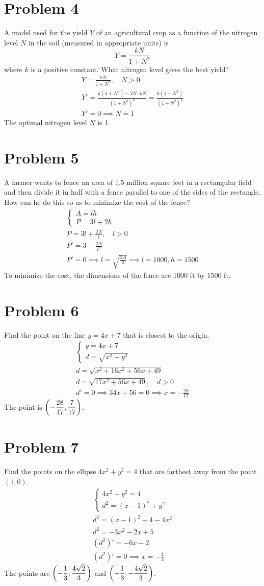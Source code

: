 \documentclass[12pt]{article}
\newcommand*{\paren}[1]{\ensuremath\left(#1\right)}
\newcommand{\problem}[1]{\section{Problem #1}}
\begin{document}
\problem{4}
 A model used for the yield $Y$ of an agricultural crop as a function of the nitrogen level $N$ in the soil
(measured in appropriate units) is
\[
Y=\frac{kN}{1+N^2}
\]
where $k$ is a positive constant. What nitrogen level gives the best yield?
\begin{gather*}
    Y=\frac{kN}{1+N^2}, \quad N>0\\
    Y'=\frac{k(1+N^2)-2N\cdot kN}{(1+N^2)^2}=\frac{k(1-N^2)}{(1+N^2)^2}\\
    Y'=0 \implies \boxed{N=1}
\end{gather*}
The optimal nitrogen level $N$ is 1.

\problem{5}
 A farmer wants to fence an area of 1.5 million square feet in a rectangular field and then divide it in half
with a fence parallel to one of the sides of the rectangle. How can he do this so as to minimize the cost
of the fence?
\begin{gather*}
    \begin{cases}
        A=lh\\
        P=3l+2h
    \end{cases}\\
    P=3l+\frac{2A}{l}, \quad l>0\\
    P'=3-\frac{2A}{l^2}\\
    P'=0 \implies l=\sqrt{\frac{2A}{3}} \implies \boxed{l=1000, h=1500}
\end{gather*}
To minimize the cost, the dimensions of the fence are 1000 ft by 1500 ft.

\problem{6}
Find the point on the line $y = 4x + 7$ that is closest to the origin.
\begin{gather*}
    \begin{cases}
        y=4x+7\\
        d=\sqrt{x^2+y^2}
    \end{cases}\\
    d=\sqrt{x^2+16x^2+56x+49}\\
    d=\sqrt{17x^2+56x+49},\quad d>0\\
    d'=0\implies 34x+56=0 \implies \boxed{x=-\frac{28}{17}}
\end{gather*}
The point is $\paren{-\dfrac{28}{17},\dfrac{7}{17}}$.

\problem{7}
Find the points on the ellipse $4x^2 + y^2 = 4$ that are farthest away from the point $(1, 0)$.
\begin{gather*}
    \begin{cases}
        4x^2 + y^2 = 4\\
        d^2=(x-1)^2+y^2
    \end{cases}\\
    d^2=(x-1)^2+4-4x^2\\
    d^2=-3x^2-2x+5\\
    (d^2)'=-6x-2\\
    (d^2)'=0 \implies \boxed{x=-\frac{1}{3}}
\end{gather*}
The points are $\paren{-\dfrac{1}{3},\dfrac{4\sqrt{2}}{3}}$ and $\paren{-\dfrac{1}{3},-\dfrac{4\sqrt{2}}{3}}$.
\end{document}
